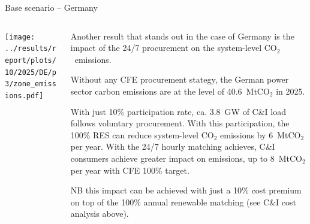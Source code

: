\begin{frame}{Base scenario -- Germany}

  {\footnotesize
  \vspace{0.1cm}
  
  \begin{columns}[T]
  \begin{column}{9cm}
  \centering
  
  \texttt{[image: ../results/report/plots/10/2025/DE/p3/zone\_emissions.pdf]}
  
  \end{column}
  \begin{column}{6cm}
  
  \vspace{0.1cm}
  Another result that stands out in the case of Germany is the
  impact of the 24/7 procurement on the system-level CO$_2$~emissions. 
  
  \vspace{0.1cm}
  Without any CFE procurement stategy, 
  the German power sector carbon emissions are at the level of 
  40.6~MtCO$_2$ in 2025.
  
  \vspace{0.1cm}
  With just 10\% participation rate, ca. \alert{3.8~GW} of C\&I load 
  follows voluntary procurement. 
  With this participation, the 100\% RES can reduce system-level 
  CO$_2$ emissions by \alert{6~MtCO$_2$} per year.
  With the 24/7 hourly matching achieves, C\&I consumers  
  achieve greater impact on emissions, up to \alert{8~MtCO$_2$} per year
  with CFE 100\% target.

  \vspace{0.1cm}
  NB this impact can be achieved with just a \alert{10\% cost premium}
  on top of the 100\% annual renewable matching (see C\&I cost analysis above).

  \end{column}
  \end{columns}
  }
\end{frame}



